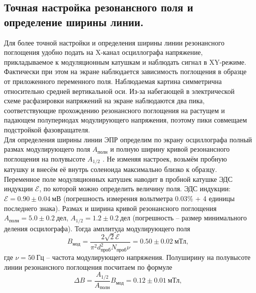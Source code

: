 \documentclass[a4paper,12pt]{article}
\begin{document}
\subsection*{Точная настройка резонансного поля и определение ширины линии.}
    Для более точной настройки и определения ширины линии резонансного поглощения удобно подать на X-канал осциллографа напряжение, 
    прикладываемое к модуляционным катушкам и наблюдать сигнал в XY-режиме. 
    Фактически при этом на экране наблюдается зависимость поглощения в образце от приложенного переменного поля. 
    Наблюдаемая картина симметрична относительно средней вертикальной оси. 
    Из-за набегающей в электрической схеме расфазировки напряжений на экране наблюдаются два пика, 
    соответствующие прохождению резонансного поглощения на растущем и падающем полупериодах модулирующего напряжения, 
    поэтому пики совмещаем подстройкой фазовращателя.\\
    Для определения ширины линии ЭПР определим по экрану осциллографа полный размах
    модулирующего поля $A_{\text{полн}}$ и полную ширину кривой резонансного
    поглощения на полувысоте $A_{\text{1/2}}$ . Не изменяя настроек, возьмём пробную катушку и внесём её внутрь соленоида максимально близко к образцу. 
    Переменное поле модуляционных катушек наводит в пробной катушке ЭДС индукции $\mathcal{E}$, 
    по которой можно определить величину поля. ЭДС индукции: $\mathcal{E} = 0.90\pm 0.04~\text{мВ}$ (погрешность измерения вольтметра 0.03\% + 4 единицы последнего знака). 
    Размах и ширина кривой резонансного поглощения $A_{\text{полн}} = 5.0 \pm 0.2~\text{дел}$, $A_{\text{1/2}} = 1.2 \pm 0.2~\text{дел}$ (погрешность -- размер минимального деления осцилографа). 
    Тогда амплитуда модулирующего поля
    \[B_{\text{мод}} = \dfrac{2\sqrt{2}\mathcal{E}}{\pi^2 d_{\text{проб}}^2 N_{\text{проб}}\nu} = 0.50 \pm 0.02~\text{мТл},\]
    где $\nu = 50~\text{Гц}$ -- частота модулирующего напряжения. Полуширину на полувысоте линии резонансного поглощения посчитаем по формуле
    \[\Delta B = \dfrac{A_{1/2}}{A_{\text{полн}}} B_{\text{мод}} = 0.12 \pm 0.01~\text{мТл},\]
\end{document}
